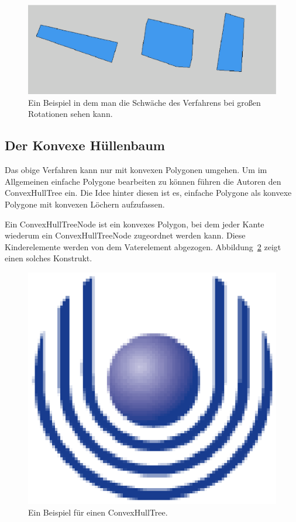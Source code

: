 \begin{figure}
	\centering
	\includegraphics[scale=0.6]{Rotation.eps}
	\caption{Ein Beispiel in dem man die Schwäche des Verfahrens bei großen Rotationen sehen kann.}
	\label{fig:BeispielschlechteRot}
\end{figure}

\subsection{Der Konvexe Hüllenbaum}

Das obige Verfahren kann nur mit konvexen Polygonen umgehen. Um im Allgemeinen einfache Polygone bearbeiten zu können führen die Autoren den ConvexHullTree ein. Die Idee hinter diesen ist es, einfache Polygone als konvexe Polygone mit konvexen Löchern aufzufassen. 

Ein ConvexHullTreeNode ist ein konvexes Polygon, bei dem jeder Kante wiederum ein ConvexHullTreeNode zugeordnet werden kann. Diese Kinderelemente werden von dem Vaterelement abgezogen. Abbildung~\ref{fig:ConHullTree} zeigt einen solches Konstrukt.

\begin{figure}
	\centering
	\includegraphics{feu_logo2.eps}
	\caption{Ein Beispiel für einen ConvexHullTree.}
	\label{fig:ConHullTree}
\end{figure}

